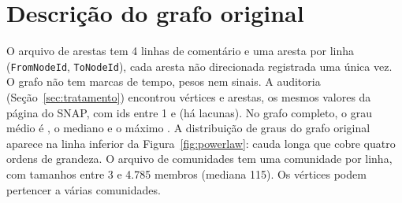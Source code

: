 \IfFileExists{webmedia.cls}{\documentclass[sigconf]{webmedia}}{\documentclass[sigconf]{acmart}}
\begin{document}
\section{Descrição do grafo original}\label{sec:original}
O arquivo de arestas tem 4 linhas de comentário e uma aresta por linha (\texttt{FromNodeId}, \texttt{ToNodeId}), cada aresta não direcionada registrada uma única vez. O grafo não tem marcas de tempo, pesos nem sinais. A auditoria (Seção~\ref{sec:tratamento}) encontrou \origV{} vértices e \origE{} arestas, os mesmos valores da página do SNAP, com ids entre 1 e \origIdMax{} (há lacunas). No grafo completo, o grau médio é \origGrauMedio, o mediano \origGrauMediano{} e o máximo \origGrauMax. A distribuição de graus do grafo original aparece na linha inferior da Figura~\ref{fig:powerlaw}: cauda longa que cobre quatro ordens de grandeza. O arquivo de comunidades tem uma comunidade por linha, com tamanhos entre 3 e 4.785 membros (mediana 115). Os vértices podem pertencer a várias comunidades.

\end{document}
